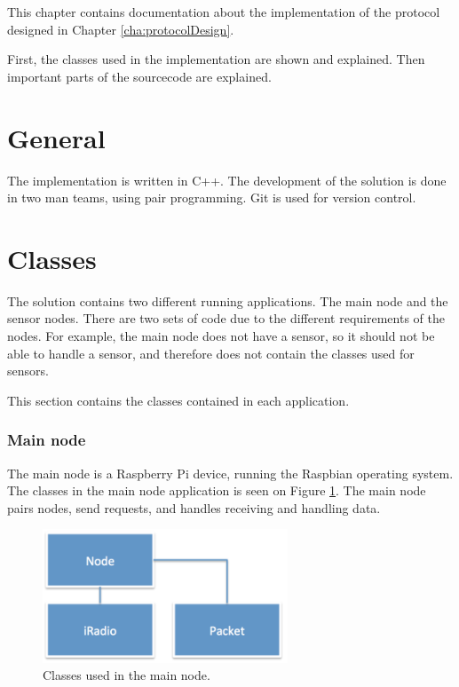 This chapter contains documentation about the implementation of the protocol designed in Chapter \ref{cha:protocolDesign}. 

First, the classes used in the implementation are shown and explained. Then important parts of the sourcecode are explained.
 

\section{General}
The implementation is written in C++. The development of the solution is done in two man teams, using pair programming. Git is used for version control.

\section{Classes}
The solution contains two different running applications. The main node and the sensor nodes. There are two sets of code due to the different requirements of the nodes. For example, the main node does not have a sensor, so it should not be able to handle a sensor, and therefore does not contain the classes used for sensors.

This section contains the classes contained in each application.

\subsubsection*{Main node}
The main node is a Raspberry Pi device, running the Raspbian operating system. The classes in the main node application is seen on Figure \ref{fig:mainnodeClass}.
The main node pairs nodes, send requests, and handles receiving and handling data.

\begin{figure}[h!]
\centering
\includegraphics[width=0.65\textwidth]{chapters/implementation/figures/mainnodeClass.png}
\caption{Classes used in the main node.}
\label{fig:mainnodeClass}
\end{figure}



